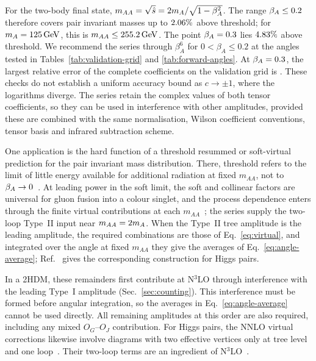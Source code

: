 For the two-body final state, $m_{AA}=\sqrt{\hat s}=2m_A/\sqrt{1-\beta_A^2}$.
The range $\beta_A\leq0.2$ therefore covers pair invariant masses
up to $2.06\%$ above threshold; for
$m_A=125\,\mathrm{GeV}$, this is $m_{AA}\leq255.2\,\mathrm{GeV}$.
The point $\beta_A=0.3$ lies $4.83\%$ above threshold.
We recommend the series through $\beta_A^6$ for $0<\beta_A\leq0.2$
at the angles tested in Tables~\ref{tab:validation-grid} and \ref{tab:forward-angles}.
At $\beta_A=0.3$, the largest relative error of the complete coefficients on the validation grid is \PtwoErrAtPointThree{}.
These checks do not establish a uniform accuracy bound as $c\to\pm1$, where
the logarithms diverge. The series retain the complex values of both tensor
coefficients, so they can be used in interference with other amplitudes,
provided these are combined with the same normalisation, Wilson coefficient
conventions, tensor basis and infrared subtraction scheme.

One application is the hard function of a threshold resummed or
soft-virtual prediction for the pair invariant mass distribution. There,
threshold refers to the limit of little energy available for additional
radiation at fixed $m_{AA}$, not to
$\beta_A\to0$~\cite{Sterman:1986aj,Catani:1989ne,deFlorian:2015moa}. At leading power in the soft limit, the soft and collinear factors are universal for gluon fusion into a colour singlet,
and the process dependence enters through the finite virtual contributions
at each $m_{AA}$~\cite{deFlorian:2012za,Bhattacharya:2021nsv}; the series
supply the two-loop Type~II input near $m_{AA}=2m_A$. When the Type~II tree
amplitude is the leading amplitude, the required combinations are those of
Eq.~\eqref{eq:virtual}, and integrated over the angle at fixed $m_{AA}$
they give the averages of Eq.~\eqref{eq:angle-average};
Ref.~\cite{deFlorian:2015moa} gives the corresponding construction for
Higgs pairs.

In a 2HDM, these remainders first contribute at N$^3$LO through
interference with the leading Type~I amplitude
(Sec.~\ref{sec:counting}).
This interference must be formed before angular integration, so the
averages in Eq.~\eqref{eq:angle-average} cannot be used directly.
All remaining amplitudes at this order are also required, including
any mixed $O_G$--$O_J$ contribution.
For Higgs pairs, the NNLO virtual corrections likewise involve
diagrams with two effective vertices only at tree level and one
loop~\cite{deFlorianMazzitelli2013Virtual}.
Their two-loop terms are an ingredient of
N$^3$LO~\cite{Banerjee:2018lfq}.
